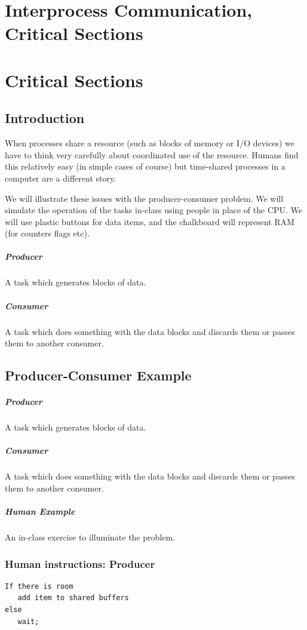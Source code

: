 \documentclass{article}	%
\begin{document}
\section*{ Interprocess Communication, Critical Sections}

\section{Critical Sections}
\subsection*{Introduction}

When processes share a resource (such as blocks of memory
or I/O devices) we have to think very carefully about coordinated
use of the resource.  Humans find this relatively easy (in
simple cases of course) but time-shared processes in a computer
are a different story.

We will illustrate these issues with the producer-consumer
problem.  We will simulate the operation of the tasks in-class
using people in place of the CPU.  We will use plastic buttons
for data items, and the chalkboard will represent RAM (for
counters flags etc).

\subparagraph{Producer} A task which generates blocks of data.

\subparagraph{Consumer} A task which does something with the data
blocks and discards them or passes them to another consumer.




\subsection{Producer-Consumer Example}

\subparagraph{Producer} A task which generates blocks of data.

\subparagraph{Consumer} A task which does something with the data
blocks and discards them or passes them to another consumer.

\subparagraph{Human Example}   An in-class exercise to illuminate
the problem.



\subsubsection{Human instructions: Producer }
\begin{verbatim}
If there is room
   add item to shared buffers
else
   wait;
\end{verbatim}
\end{document}

